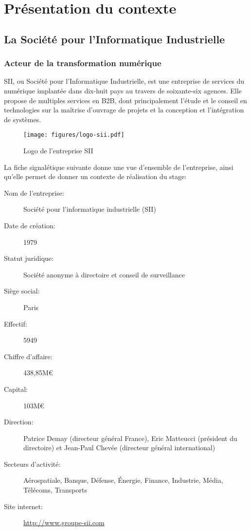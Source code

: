 \chapter{Présentation du contexte}
{
	\section{La Société pour l'Informatique Industrielle}
	{
		\subsection{Acteur de la transformation numérique}
		{
			\par
			{
				SII, ou Société pour l'Informatique Industrielle, est une entreprise de services du numérique implantée dans dix-huit pays au travers de soixante-six agences. Elle propose de multiples services en B2B, dont principalement l'étude et le conseil en technologies sur la maîtrise d'ouvrage de projets et la conception et l'intégration de systèmes.
			}
			
			\begin{figure}[h]
			{
				\centering
				\texttt{[image: figures/logo-sii.pdf]}
				\caption{Logo de l'entreprise SII}
				\label{fig:logo-sii}
			}
			\end{figure}
			
			\par
			{
				La fiche signalétique suivante donne une vue d'ensemble de l'entreprise, ainsi qu'elle permet de donner un contexte de réalisation du stage:
			
				\begin{description}
					\item[Nom de l'entreprise:] Société pour l'informatique industrielle (SII)
					\item[Date de création:] 1979\cite{sii_rf}
					\item[Statut juridique:] Société anonyme à directoire et conseil de surveillance
					\item[Siège social:] Paris
					\item[Effectif:] 5949\cite{sii_rs_2017}
					\item[Chiffre d'affaire:] 438,85M\euro\cite{sii_rs_2017}
					\item[Capital:] 103M\euro\cite{sii_rf}
					\item[Direction:] Patrice Demay (directeur général France), Eric Matteucci (président du directoire) et Jean-Paul Chevée (directeur général international)
					\item[Secteurs d'activité:] Aérospatiale, Banque, Défense, Énergie, Finance, Industrie, Média, Télécoms, Transports
					\item[Site internet:] \url{http://www.groupe-sii.com}
				\end{description}
			}
			
}}}
